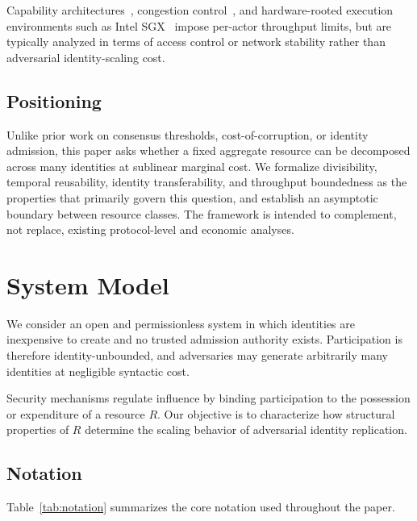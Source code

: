 \documentclass[journal]{IEEEtran}
\begin{document}
	Capability architectures~\cite{levy1984capability},
	congestion control~\cite{jacobson1988congestion},
	and hardware-rooted execution environments such as
	Intel SGX~\cite{costan2016intel} impose per-actor throughput
	limits, but are typically analyzed in terms of access control
	or network stability rather than adversarial identity-scaling
	cost.
	
	\subsection{Positioning}
	
	Unlike prior work on consensus thresholds, cost-of-corruption,
	or identity admission, this paper asks whether a fixed
	aggregate resource can be decomposed across many identities
	at sublinear marginal cost.
	We formalize divisibility, temporal reusability,
	identity transferability, and throughput boundedness as
	the properties that primarily govern this question, and
	establish an asymptotic boundary between resource classes.
	The framework is intended to complement, not replace,
	existing protocol-level and economic analyses.
	\section{System Model}
	
	We consider an open and permissionless system in which identities
	are inexpensive to create and no trusted admission authority exists.
	Participation is therefore identity-unbounded,
	and adversaries may generate arbitrarily many identities
	at negligible syntactic cost.
	
	Security mechanisms regulate influence by binding participation
	to the possession or expenditure of a resource $R$.
	Our objective is to characterize how structural properties of $R$
	determine the scaling behavior of adversarial identity replication.
	
	\subsection{Notation}
	
	Table~\ref{tab:notation} summarizes the core notation used throughout the paper.
	
\end{document}
